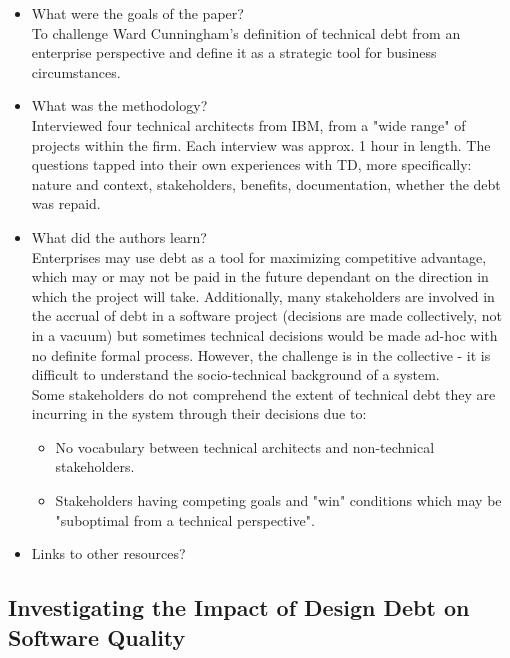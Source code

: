 \documentclass{mprop}
\begin{document}
\begin{itemize}
	\item What were the goals of the paper? \\
	To challenge Ward Cunningham's definition of technical debt from an enterprise perspective and define it as a strategic tool for business circumstances.
	\item What was the methodology? \\
	Interviewed four technical architects from IBM, from a "wide range" of projects within the firm. Each interview was approx. 1 hour in length. 
	The questions tapped into their own experiences with TD, more specifically: nature and context, stakeholders, benefits, documentation, whether the debt was repaid. 
	\item What did the authors learn? \\
	Enterprises may use debt as a tool for maximizing competitive advantage, which may or may not be paid in the future dependant on the direction in which the project will take.
	Additionally, many stakeholders are involved in the accrual of debt in a software project (decisions are made collectively, not in a vacuum) but sometimes technical decisions would be made ad-hoc with no definite formal process.
	However, the challenge is in the collective - it is difficult to understand the socio-technical background of a system. \\
	
	Some stakeholders do not comprehend the extent of technical debt they are incurring in the system through their decisions due to: 
	\begin{itemize}
		\item No vocabulary between technical architects and non-technical stakeholders.
		\item Stakeholders having competing goals and "win" conditions which may be "suboptimal from a technical perspective".
	\end{itemize} 
	\item Links to other resources?
\end{itemize}


\subsection{Investigating the Impact of Design Debt on Software Quality} \cite{Zazworka2011}
\end{document}
